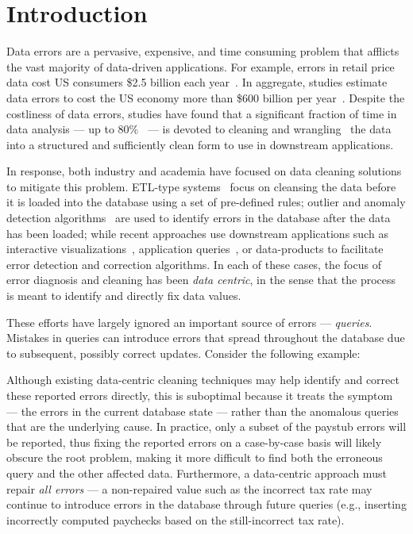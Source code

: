 
\section{Introduction}
\label{s:intro}
Data errors are a pervasive, expensive, and time consuming problem
that afflicts the vast majority of data-driven applications. For
example, errors in retail price data cost US consumers \$2.5 billion
each year~\cite{Fan2008}. In aggregate, studies estimate data errors
to cost the US economy more than \$600 billion per
year~\cite{eckerson2002}. Despite the costliness of data errors, 
studies have found that a significant fraction of time in data analysis 
--- up to 80\%~\cite{kandel2012} --- is devoted to cleaning and
wrangling~\cite{kandel2011wrangler} the data into a structured and
sufficiently clean form to use in downstream applications.

In response, both industry and academia have focused on data cleaning solutions to mitigate this problem.
ETL-type systems~\cite{krishnamurthy2009systemt, thomsen2005survey} focus on cleansing the data before it is loaded into the database
using a set of pre-defined rules; outlier and anomaly detection
 algorithms~\cite{chandola2007outlier} are used to identify errors
in the database after the data has been loaded; while recent approaches use downstream applications
such as interactive visualizations~\cite{kandel2011wrangler,Wu13}, application queries~\cite{krishnan2015sampleclean}, or 
data-products to facilitate error detection and correction algorithms.
In each of these cases, the focus of error diagnosis and cleaning has been {\it data centric}, in the sense that
the process is meant to identify and directly fix data values.

These efforts have largely ignored an important source of errors --- {\it queries}.
Mistakes in queries can introduce errors that spread throughout the database due to subsequent, possibly correct updates.
Consider the following %
example:


%

Although existing data-centric cleaning techniques may help identify and correct these reported errors directly, 
this is suboptimal because it treats the symptom --- the errors in the current database state --- rather than the anomalous
queries that are the underlying cause.  In practice, only a subset of the paystub errors will be reported, thus fixing
the reported errors on a case-by-case basis will likely obscure the root problem, making it more difficult to
find both the erroneous query and the other affected data.  
Furthermore, a data-centric approach must repair \emph{all errors} --- a non-repaired value such as the incorrect tax rate
may continue to introduce errors in the database through future queries 
(e.g., inserting incorrectly computed paychecks based on the still-incorrect tax rate).

